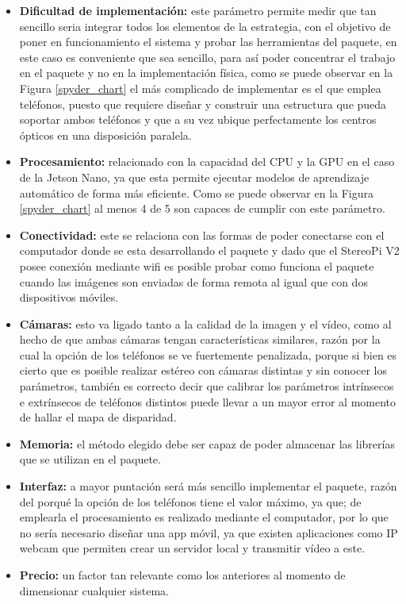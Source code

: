 \begin{itemize}
    \item \textbf{Dificultad de implementación:} este parámetro permite medir que tan sencillo seria integrar todos los elementos de la estrategia, con el objetivo de poner en funcionamiento el sistema y probar las herramientas del paquete, en este caso es conveniente que sea sencillo, para así poder concentrar el trabajo en el paquete y no en la implementación física, como se puede observar en la Figura \ref{spyder_chart} el más complicado de implementar es el que emplea teléfonos, puesto que requiere diseñar y construir una estructura que pueda soportar ambos teléfonos y que a su vez ubique perfectamente los centros ópticos en una disposición paralela.
    \item \textbf{Procesamiento:} relacionado con la capacidad del CPU y la GPU en el caso de la Jetson Nano, ya que esta permite ejecutar modelos de aprendizaje automático de forma más eficiente. Como se puede observar en la Figura \ref{spyder_chart} al menos 4 de 5 son capaces de cumplir con este parámetro.
    \item \textbf{Conectividad:} este se relaciona con las formas de poder conectarse con el computador donde se esta desarrollando el paquete y dado que el StereoPi V2 posee conexión mediante wifi es posible probar como funciona el paquete cuando las imágenes son enviadas de forma remota al igual que con dos dispositivos móviles.
    \item \textbf{Cámaras:} esto va ligado tanto a la calidad de la imagen y el vídeo, como al hecho de que ambas cámaras tengan características similares, razón por la cual la opción de los teléfonos se ve fuertemente penalizada, porque si bien es cierto que es posible realizar estéreo con cámaras distintas y sin conocer los parámetros, también es correcto decir que calibrar los parámetros intrínsecos e extrínsecos de teléfonos distintos puede llevar a un mayor error al momento de hallar el mapa de disparidad.
    \item \textbf{Memoria:} el método elegido debe ser capaz de poder almacenar las librerías que se utilizan en el paquete.
    \item \textbf{Interfaz:} a mayor puntación será más sencillo implementar el paquete, razón del porqué la opción de los teléfonos tiene el valor máximo, ya que; de emplearla el procesamiento es realizado mediante el computador, por lo que no sería necesario diseñar una app móvil, ya que existen aplicaciones como IP webcam que permiten crear un servidor local y transmitir vídeo a este.
    \item \textbf{Precio:} un factor tan relevante como los anteriores al momento de dimensionar cualquier sistema.
\end{itemize}
